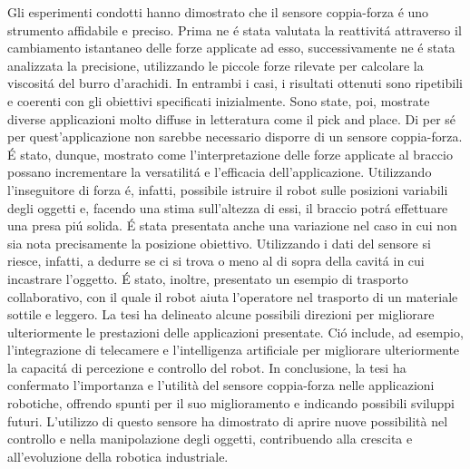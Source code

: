 Gli esperimenti condotti hanno dimostrato che il sensore coppia-forza \'{e} uno strumento affidabile e preciso. 
Prima ne \'{e} stata valutata la reattivit\'{a} attraverso il cambiamento istantaneo delle forze applicate ad esso, 
successivamente ne \'{e} stata analizzata la precisione, utilizzando le piccole forze rilevate per calcolare la viscosit\'{a} del 
burro d'arachidi. 
In entrambi i casi, i risultati ottenuti sono ripetibili e coerenti con gli obiettivi specificati inizialmente. 
Sono state, poi, mostrate diverse applicazioni molto diffuse in letteratura come il pick and place. Di per s\'{e} per 
quest'applicazione non sarebbe necessario disporre di un sensore coppia-forza. \'{E} stato, dunque, mostrato come l'interpretazione 
delle forze applicate al braccio possano incrementare la versatilit\'{a} e l'efficacia dell'applicazione. Utilizzando 
l'inseguitore di forza \'{e}, infatti, possibile istruire il robot sulle posizioni variabili degli oggetti e, facendo una stima 
sull'altezza di essi, il braccio potr\'{a} effettuare una presa pi\'{u} solida. 
\'{E} stata presentata anche una variazione nel caso in cui non sia nota precisamente la posizione obiettivo. Utilizzando i dati 
del sensore si riesce, infatti, a dedurre se ci si trova o meno al di sopra della cavit\'{a} in cui incastrare l'oggetto. 
\'{E} stato, inoltre, presentato un esempio di trasporto collaborativo, con il quale il robot aiuta l'operatore nel trasporto 
di un materiale sottile e leggero. 
La tesi ha delineato alcune possibili direzioni per migliorare ulteriormente le prestazioni delle applicazioni presentate. 
Ci\'{o} include, ad esempio, l'integrazione di telecamere e l'intelligenza artificiale per migliorare ulteriormente la capacit\'{a} 
di percezione e controllo del robot. 
In conclusione, la tesi ha confermato l'importanza e l'utilità del sensore coppia-forza nelle applicazioni robotiche, 
offrendo spunti per il suo miglioramento e indicando possibili sviluppi futuri. L'utilizzo di questo sensore ha dimostrato 
di aprire nuove possibilità nel controllo e nella manipolazione degli oggetti, contribuendo alla crescita e all'evoluzione 
della robotica industriale.